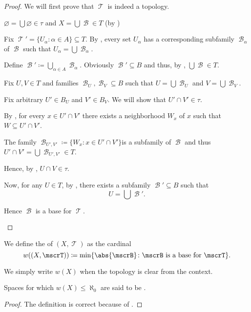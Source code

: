 \begin{proof}
  We will first prove that \( \mscrT \) is indeed a topology.

  \begin{refenum}
     \( \varnothing = \bigcup \varnothing \in \tau \) and \( X = \bigcup \mscrB \in T \) (by )

     Fix \( \mscrT' = \{ U_\alpha \colon \alpha \in A \} \subseteq T \). By , every set \( U_\alpha \) has a corresponding subfamily \( \mscrB_\alpha \) of \( \mscrB \) such that \( U_\alpha = \bigcup \mscrB_\alpha \).

    Define \( \mscrB' \coloneqq \bigcup_{\alpha \in A} \mscrB_\alpha \). Obviously \( \mscrB' \subseteq B \) and thus, by , \( \bigcup \mscrB \in T \).

     Fix \( U, V \in T \) and families \( \mscrB_U, \mscrB_V \subseteq B \) such that \( U = \bigcup \mscrB_U \) and \( V = \bigcup \mscrB_V \).

    Fix arbitrary \( U' \in B_U \) and \( V' \in B_V \). We will show that \( U' \cap V' \in \tau \).

    By , for every \( x \in U' \cap V' \) there exists a neighborhood \( W_x \) of \( x \) such that \( W \subseteq U' \cap V' \).

    The family \( \mscrB_{U',V'} \coloneqq \{ W_x \colon x \in U' \cap V' \} \)\AOC is a subfamily of \( \mscrB \) and thus \( U' \cap V' = \bigcup \mscrB_{U',V'} \in T \).

    Hence, by , \( U \cap V \in \tau \).

    Now, for any \( U \in T \), by , there exists a subfamily \( \mscrB' \subseteq B \) such that
    \begin{equation*}
      U = \bigcup \mscrB'.
    \end{equation*}

    Hence \( \mscrB \) is a base for \( \mscrT \).
  \end{refenum}
\end{proof}

\begin{definition}\label{def:topological_space_weight}
  We define the  of \( (X, \mscrT) \) as the cardinal
  \begin{equation*}
    w((X, \mscrT)) \coloneqq \min \{ \abs{\mscrB} \colon \mscrB \text{ is a base for } \mscrT \}.
  \end{equation*}

  We simply write \( w(X) \) when the topology is clear from the context.

  Spaces for which \( w(X) \leq \aleph_0 \) are said to be .
\end{definition}
\begin{proof}
  The definition is correct because of .
\end{proof}

